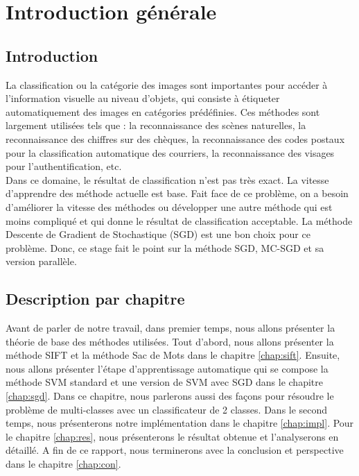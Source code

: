 \chapter{Introduction générale}

\section{Introduction}

La classification ou la catégorie des images sont importantes pour accéder à l'information visuelle au niveau d'objets, qui consiste à étiqueter automatiquement des images en catégories prédéfinies. Ces méthodes sont largement utilisées tels que : la reconnaissance des scènes naturelles, la reconnaissance des chiffres sur des chèques, la reconnaissance des codes postaux pour la classification automatique des courriers, la reconnaissance des visages pour l'authentification, etc.\\

Dans ce domaine, le résultat de classification n'est pas très exact. La vitesse d'apprendre des méthode actuelle est base. Fait face de ce problème, on a besoin d'améliorer la vitesse des méthodes ou développer une autre méthode qui est moins compliqué et qui donne le résultat de classification acceptable. La méthode Descente de Gradient de Stochastique (SGD) est une bon choix pour ce problème. Donc, ce stage fait le point sur la méthode SGD, MC-SGD et sa version parallèle.

\section{Description par chapitre}

Avant de parler de notre travail, dans premier temps, nous allons présenter la théorie de base des méthodes utilisées. Tout d'abord, nous allons présenter la méthode SIFT et la méthode Sac de Mots dans le chapitre \ref{chap:sift}. Ensuite, nous allons présenter l'étape d'apprentissage automatique qui se compose la méthode SVM standard et une version de SVM avec SGD dans le chapitre \ref{chap:sgd}. Dans ce chapitre, nous parlerons aussi des façons pour résoudre le problème de multi-classes avec un classificateur de 2 classes. Dans le second temps, nous présenterons notre implémentation dans le chapitre \ref{chap:impl}. Pour le chapitre \ref{chap:res}, nous présenterons le résultat obtenue et l'analyserons en détaillé. A fin de ce rapport, nous terminerons avec la conclusion et perspective dans le chapitre \ref{chap:con}.